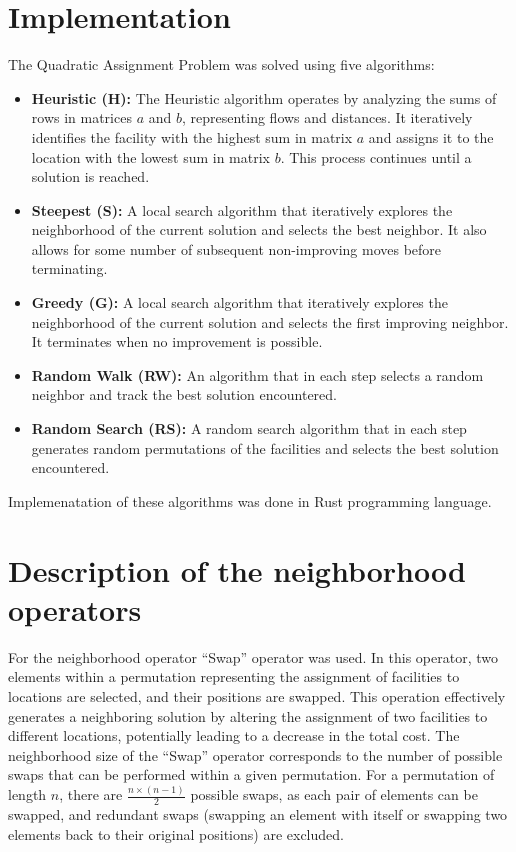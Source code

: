 \documentclass{article}
\begin{document}
\section{Implementation}\label{sec:implementation}
The Quadratic Assignment Problem was solved using five algorithms:
\begin{itemize}
    \item \textbf{Heuristic (H):} The Heuristic algorithm operates by analyzing the sums of rows in matrices $a$ and $b$, representing flows and distances.
        It iteratively identifies the facility with the highest sum in matrix $a$ and assigns it to the location with the lowest sum in matrix $b$.
        This process continues until a solution is reached.
    \item \textbf{Steepest (S):} A local search algorithm that iteratively explores the neighborhood of the current solution and selects the best neighbor.
        It also allows for some number of subsequent non-improving moves before terminating.
    \item \textbf{Greedy (G):} A local search algorithm that iteratively explores the neighborhood of the current solution and selects the first improving neighbor.
        It terminates when no improvement is possible.
    \item \textbf{Random Walk (RW):} An algorithm that in each step selects a random neighbor and track the best solution encountered.
    \item \textbf{Random Search (RS):} A random search algorithm that in each step generates random permutations of the facilities and selects the best solution encountered.
\end{itemize}

Implemenatation of these algorithms was done in Rust programming language.


\section{Description of the neighborhood operators}\label{sec:description-of-the-neighborhood-operators}
For the neighborhood operator ``Swap'' operator was used.
In this operator, two elements within a permutation representing the assignment of facilities to locations are selected,
and their positions are swapped.
This operation effectively generates a neighboring solution by altering the assignment of two facilities to different locations,
potentially leading to a decrease in the total cost.
The neighborhood size of the ``Swap'' operator corresponds to the number of possible swaps that can be performed within a given permutation.
For a permutation of length $n$, there are $\frac{n \times (n-1)}{2}$ possible swaps, as each pair of elements can be swapped,
and redundant swaps (swapping an element with itself or swapping two elements back to their original positions) are excluded.
\end{document}
